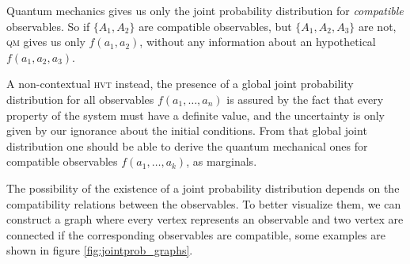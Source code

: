 \documentclass[a4paper]{article}
\newcommand{\acron}[1]{\textsc{#1}}
\newcommand{\HVT}{\acron{hvt}}
\newcommand{\QM}{\acron{qm}}
\theoremstyle{definition}
\begin{document}
Quantum mechanics gives us only the joint probability distribution for
\emph{compatible} observables.
So if $\{A_1, A_2\}$ are compatible observables, but $\{A_1, A_2, A_3\}$ are
not, \QM{} gives us only $f(a_1, a_2)$, without any information about an
hypothetical $f(a_1, a_2, a_3)$.

A non-contextual \HVT{} instead, the presence of a global joint probability distribution for all
observables $f(a_1, \ldots, a_n)$ is assured by the fact that every property of
the system must have a definite value, and the uncertainty is only given by our
ignorance about the initial conditions.
From that global joint distribution one should be able to derive the quantum
mechanical ones for compatible observables $f(a_1, \ldots, a_k)$, as marginals.

The possibility of the existence of a joint probability distribution depends on
the compatibility relations between the observables.
To better visualize them, we can construct a graph where every vertex represents
an observable and two vertex are connected if the corresponding observables are
compatible, some examples are shown in figure \ref{fig:jointprob_graphs}.
\end{document}
